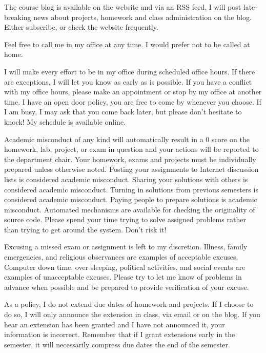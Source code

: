 \documentclass{tufte-handout}
\begin{document}
 The course blog is available on the website and via
an RSS feed.  I will post late-breaking news about projects, homework
and class administration on the blog.  Either subscribe, or check the
website frequently.

 Feel free to call me in my office at any time.  I
would prefer not to be called at home.

 I will make every effort to be in my office
during scheduled office hours. If there are exceptions, I will let you
know as early as is possible. If you have a conflict with my office
hours, please make an appointment or stop by my office at another
time. I have an open door policy, you are free to come by whenever you
choose. If I am busy, I may ask that you come back later, but please
don't hesitate to knock! My schedule is available online.

 Academic misconduct of any kind will
automatically result in a 0 score on the homework, lab, project, or
exam in question and your actions will be reported to the department
chair.  Your homework, exams and projects must be individually
prepared unless otherwise noted.  Posting your assignments to Internet
discussion lists is considered academic misconduct. Sharing your
solutions with others is considered academic misconduct.  Turning in
solutions from previous semesters is considered academic misconduct.
Paying people to prepare solutions is academic misconduct.  Automated
mechanisms are available for checking the originality of source
code. Please spend your time trying to solve assigned problems rather
than trying to get around the system.  Don't risk it!

 Excusing a missed exam or assignment is left to my
discretion. Illness, family emergencies, and religious observances are
examples of acceptable excuses. Computer down time, over sleeping,
political activities, and social events are examples of unacceptable
excuses. Please try to let me know of problems in advance when
possible and be prepared to provide verification of your excuse.

 As a policy, I do not extend due dates of
homework and projects.  If I choose to do so, I will only announce the
extension in class, via email or on the blog.  If you hear an
extension has been granted and I have not announced it, your
information is incorrect.  Remember that if I grant extensions early
in the semester, it will necessarily compress due dates the end of the
semester.
\end{document}
